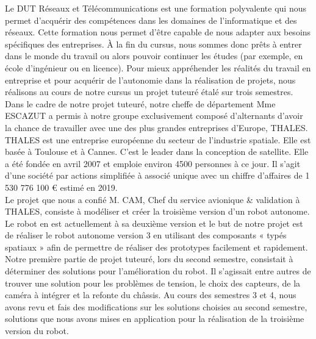 \documentclass{PackagerQualityN}
\begin{document}
Le DUT Réseaux et Télécommunications est une formation polyvalente qui nous permet d’acquérir des compétences dans les domaines de l’informatique et des réseaux. Cette formation nous permet d’être capable de nous adapter aux besoins spécifiques des entreprises. À la fin du cursus, nous sommes donc prêts à entrer dans le monde du travail ou alors pouvoir continuer les études (par exemple, en école d’ingénieur ou en licence).
Pour mieux appréhender les réalités du travail en entreprise et pour acquérir de l’autonomie dans la réalisation de projets, nous réalisons au cours de notre cursus un projet tuteuré étalé sur trois semestres.\\

Dans le cadre de notre projet tuteuré, notre cheffe de département Mme ESCAZUT a permis à notre groupe exclusivement composé d’alternants d’avoir la chance de travailler avec une des plus grandes entreprises d’Europe, THALES.\\ 

THALES est une entreprise européenne du secteur de l’industrie spatiale. Elle est basée à Toulouse et à Cannes. C'est le leader dans la conception de satellite. Elle a été fondée en avril 2007 et emploie environ 4500 personnes à ce jour. Il s’agit d’une société par actions simplifiée à associé unique avec un chiffre d’affaires de 1 530 776 100 € estimé en 2019.\\


Le projet que nous a confié M. CAM, Chef du service avionique \& validation à THALES, consiste à modéliser et créer la troisième version d’un robot autonome. Le robot en est actuellement à sa deuxième version et le but de notre projet est de réaliser le robot autonome version 3 en utilisant des composants « typés spatiaux » afin de permettre de réaliser des prototypes facilement et rapidement.\\

Notre première partie de projet tuteuré, lors du second semestre, consistait à déterminer des solutions pour l’amélioration du robot. Il s’agissait entre autres de trouver une solution pour les problèmes de tension, le choix des capteurs, de la caméra à intégrer et la refonte du châssis. Au cours des semestres 3 et 4, nous avons revu et fais des modifications sur les solutions choisies au second semestre, solutions que nous avons mises en application pour la réalisation de la troisième version du robot.\\
\end{document}
